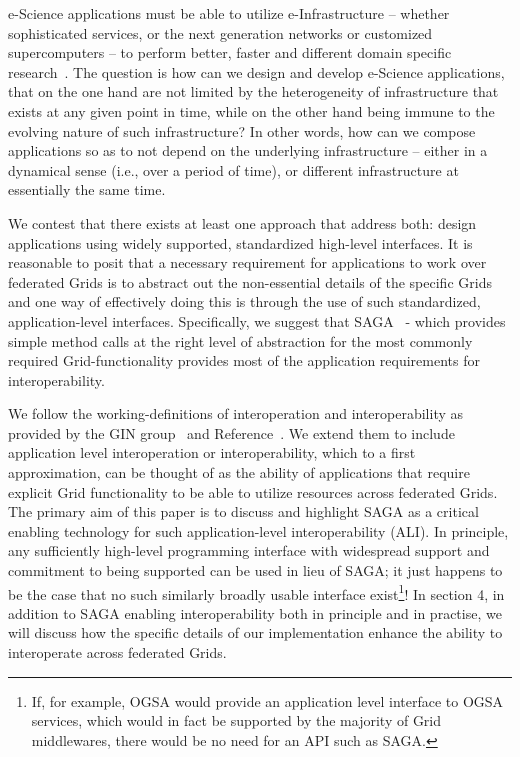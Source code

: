 \documentclass[conference,final]{IEEEtran}
\begin{document}
e-Science applications must be able to utilize e-Infrastructure --
whether sophisticated services, or the next generation networks or
customized supercomputers -- to perform better, faster and different
domain specific research~\cite{hey04, hey05}.  The question is how can
we design and develop e-Science applications, that on the one hand are
not limited by the heterogeneity of infrastructure that exists at any
given point in time, while on the other hand being immune to the
evolving nature of such infrastructure?  In other words, how can we
compose applications so as to not depend on the underlying
infrastructure -- either in a dynamical sense (i.e., over a period of
time), or different infrastructure at essentially the same time.  

We contest that there exists at least one approach that address both:
design applications using widely supported, standardized high-level
interfaces. It is reasonable to posit that a necessary requirement for
applications to work over federated Grids is to abstract out the
non-essential details of the specific Grids and one way of effectively
doing this is through the use of such standardized, application-level
interfaces. Specifically, we suggest that SAGA~\cite{saga_web} - which
provides simple method calls at the right level of abstraction for the
most commonly required Grid-functionality provides most of the
application requirements for interoperability. 


\noindent We follow the working-definitions of interoperation and
interoperability as provided by the GIN group~\cite{gin_url} and
Reference~\cite{gin_paper}.  We extend them to include application
level interoperation or interoperability, which to a first
approximation, can be thought of as the ability of applications that
require explicit Grid functionality to be able to utilize resources
across federated Grids. The primary aim of this paper is to discuss
and highlight SAGA as a critical enabling technology for such
application-level interoperability (ALI). In principle, any
sufficiently high-level programming interface with widespread support
and commitment to being supported can be used in lieu of SAGA; it just
happens to be the case that no such similarly broadly usable interface
exist\footnote{If, for example, OGSA would provide an application level
interface to OGSA services, which would in fact be supported by the 
majority of Grid middlewares, there would be no need for an API such as 
SAGA.}!
In section 4, in addition to SAGA enabling interoperability
both in principle and in practise, we will discuss how the specific
details of our implementation enhance the ability to interoperate
across federated Grids.
\end{document}
